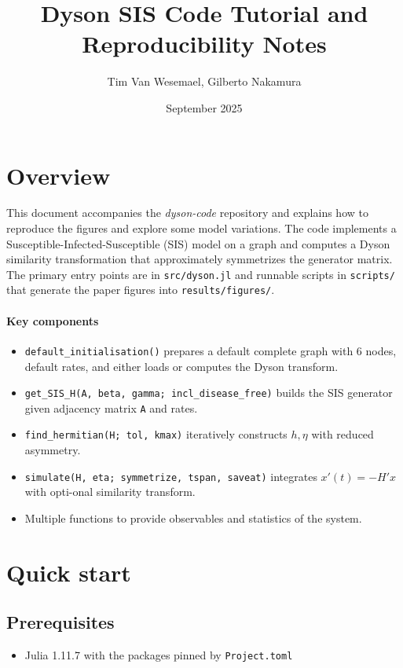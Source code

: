 \documentclass[11pt]{article}
\title{Dyson SIS Code Tutorial and Reproducibility Notes}
\author{Tim Van Wesemael, Gilberto Nakamura}
\date{September 2025}
\newcommand{\code}[1]{\texttt{#1}}
\begin{document}
\maketitle
\tableofcontents
\bigskip

\newpage

\section{Overview}
This document accompanies the \emph{dyson-code} repository and explains how to reproduce the figures and explore some model variations.
The code implements a Susceptible-Infected-Susceptible (SIS) model on a graph and computes a Dyson similarity transformation that approximately symmetrizes the generator matrix.
The primary entry points are in \code{src/dyson.jl} and runnable scripts in \code{scripts/} that generate the paper figures into \code{results/figures/}.

\paragraph{Key components}
\begin{itemize}
  \item \code{default\_initialisation()} prepares a default complete graph with 6 nodes, default rates, and either loads or computes the Dyson transform.
  \item \code{get\_SIS\_H(A, beta, gamma; incl\_disease\_free)} builds the SIS generator given adjacency matrix \code{A} and rates.
  \item \code{find\_hermitian(H; tol, kmax)} iteratively constructs \(h,\eta\) with reduced asymmetry.
  \item \code{simulate(H, eta; symmetrize, tspan, saveat)} integrates \( x'(t) = -H'x \) with opti-onal similarity transform.
  \item Multiple functions to provide observables and statistics of the system.
\end{itemize}

\section{Quick start}
\subsection{Prerequisites}
\begin{itemize}
  \item Julia 1.11.7 with the packages pinned by \code{Project.toml}
\end{itemize}
\end{document}
